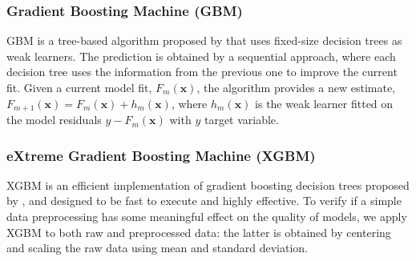 \documentclass[fleqn,10pt]{wlscirep}
\begin{document}
\subsubsection*{Gradient Boosting Machine (GBM)}
GBM is a tree-based algorithm proposed by \cite{Friedman} that uses fixed-size decision trees as weak learners. The prediction is obtained by a sequential approach, where each decision tree uses the information from the previous one to improve the current fit. Given a current model fit, $F_{m}(\mathbf{x})$, the algorithm provides a new estimate, $F_{m+1}(\mathbf{x})=F_{m}(\mathbf{x})+ h_m(\mathbf{x})$, where $h_m(\mathbf{x})$ is the weak learner fitted on the model residuals $y-F_{m}(\mathbf{x})$ with $y$ target variable.

\subsubsection*{eXtreme Gradient Boosting Machine (XGBM)}
XGBM is an efficient implementation of gradient boosting decision trees proposed by \cite{Chen}, and designed to be fast to execute and highly effective. To verify if a simple data preprocessing has some meaningful effect on the quality of models, we apply XGBM to both raw and preprocessed data: the latter is obtained by centering and scaling the raw data using mean and standard deviation.

\color{blue}
\end{document}
